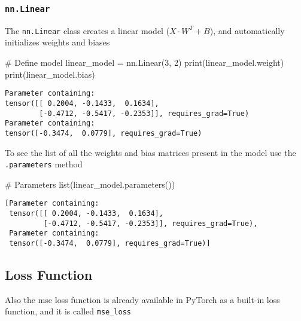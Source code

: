 \documentclass[
  letterpaper,
  DIV=11,
  numbers=noendperiod]{scrartcl}
\newenvironment{Shaded}{\begin{snugshade}}{\end{snugshade}}
\newcommand{\BuiltInTok}[1]{\textcolor[rgb]{0.00,0.23,0.31}{#1}}
\newcommand{\CommentTok}[1]{\textcolor[rgb]{0.37,0.37,0.37}{#1}}
\newcommand{\DecValTok}[1]{\textcolor[rgb]{0.68,0.00,0.00}{#1}}
\newcommand{\NormalTok}[1]{\textcolor[rgb]{0.00,0.23,0.31}{#1}}
\newcommand{\OperatorTok}[1]{\textcolor[rgb]{0.37,0.37,0.37}{#1}}
\begin{document}
\hypertarget{nn.linear}{%
\subsubsection{\texorpdfstring{\texttt{nn.Linear}}{nn.Linear}}\label{nn.linear}}

The \texttt{nn.Linear} class creates a linear model
(\(X \cdot W^{T} + B\)), and automatically initializes weights and
biases

\begin{Shaded}
\begin{Highlighting}[]
\CommentTok{\# Define model}
\NormalTok{linear\_model }\OperatorTok{=}\NormalTok{ nn.Linear(}\DecValTok{3}\NormalTok{, }\DecValTok{2}\NormalTok{)}
\BuiltInTok{print}\NormalTok{(linear\_model.weight)}
\BuiltInTok{print}\NormalTok{(linear\_model.bias)}
\end{Highlighting}
\end{Shaded}

\begin{verbatim}
Parameter containing:
tensor([[ 0.2004, -0.1433,  0.1634],
        [-0.4712, -0.5417, -0.2353]], requires_grad=True)
Parameter containing:
tensor([-0.3474,  0.0779], requires_grad=True)
\end{verbatim}

To see the list of all the weights and bias matrices present in the
model use the \texttt{.parameters} method

\begin{Shaded}
\begin{Highlighting}[]
\CommentTok{\# Parameters}
\BuiltInTok{list}\NormalTok{(linear\_model.parameters())}
\end{Highlighting}
\end{Shaded}

\begin{verbatim}
[Parameter containing:
 tensor([[ 0.2004, -0.1433,  0.1634],
         [-0.4712, -0.5417, -0.2353]], requires_grad=True),
 Parameter containing:
 tensor([-0.3474,  0.0779], requires_grad=True)]
\end{verbatim}

\hypertarget{loss-function}{%
\subsection{Loss Function}\label{loss-function}}

Also the mse loss function is already available in PyTorch as a built-in
loss function, and it is called \texttt{mse\_loss}
\end{document}
